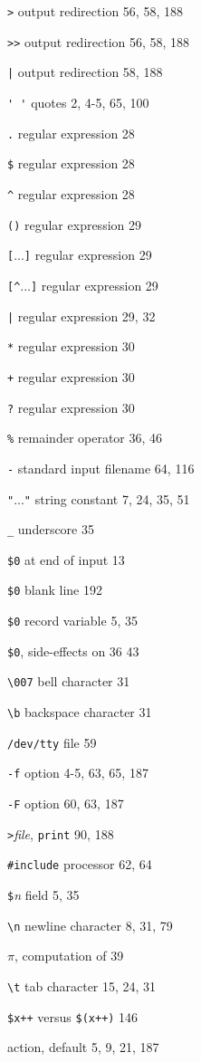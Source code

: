 \begin{multicols}{3}
\verb'>' output redirection 56, 58, 188

\verb'>>' output redirection 56, 58, 188

\verb'|' output redirection 58, 188 

\verb"' '" quotes 2, 4-5, 65, 100

\verb'.' regular expression 28

\verb'$' regular expression 28

\verb'^' regular expression 28

\verb'()' regular expression 29

\verb'['...\verb']' regular expression 29 

\verb'[^'...\verb']' regular expression 29

\verb'|' regular expression 29, 32

\verb'*' regular expression 30

\verb'+' regular expression 30

\verb'?' regular expression 30 

\verb'%' remainder operator 36, 46

\verb'-' standard input filename 64, 116

\verb'"'...\verb'"' string constant 7, 24, 35, 51

\verb'_' underscore 35

\verb'$0' at end of input 13

\verb'$0' blank line 192 

\verb'$0' record variable 5, 35 

\verb'$0', side-effects on 36 43 

\verb'\007' bell character 31 

\verb'\b' backspace character 31 

\verb'/dev/tty' file 59 

\verb'-f' option 4-5, 63, 65, 187 

\verb'-F' option 60, 63, 187 

\verb'>'\textit{file}, \verb'print' 90, 188 

\verb'#include' processor 62, 64 

\verb'$'\textit{n} field 5, 35 

\verb'\n' newline character 8, 31, 79

$\pi$, computation of 39 

\verb'\t' tab character 15, 24, 31 

\verb'$x++' versus \verb'$(x++)' 146 

action, default 5, 9, 21, 187 


\end{multicols}
